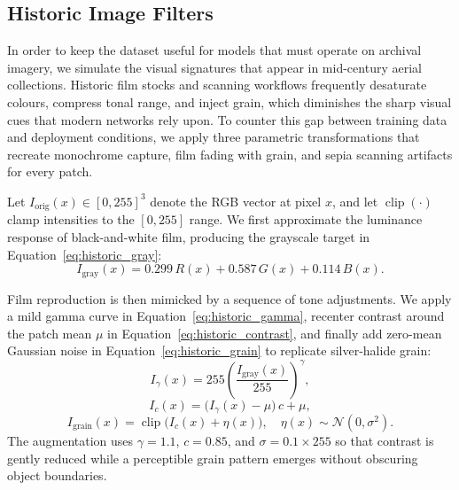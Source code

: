 \subsection{Historic Image Filters}

In order to keep the dataset useful for models that must operate on archival imagery, we simulate the visual signatures that appear in mid-century aerial collections. Historic film stocks and scanning workflows frequently desaturate colours, compress tonal range, and inject grain, which diminishes the sharp visual cues that modern networks rely upon. To counter this gap between training data and deployment conditions, we apply three parametric transformations that recreate monochrome capture, film fading with grain, and sepia scanning artifacts for every patch.

Let $I_{\text{orig}}(x) \in [0,255]^3$ denote the RGB vector at pixel $x$, and let $\operatorname{clip}(\cdot)$ clamp intensities to the $[0,255]$ range. We first approximate the luminance response of black-and-white film, producing the grayscale target in Equation~\ref{eq:historic_gray}:
\begin{equation}
I_{\text{gray}}(x) = 0.299\,R(x) + 0.587\,G(x) + 0.114\,B(x).
\label{eq:historic_gray}
\end{equation}

Film reproduction is then mimicked by a sequence of tone adjustments. We apply a mild gamma curve in Equation~\ref{eq:historic_gamma}, recenter contrast around the patch mean $\mu$ in Equation~\ref{eq:historic_contrast}, and finally add zero-mean Gaussian noise in Equation~\ref{eq:historic_grain} to replicate silver-halide grain:
\begin{equation}
I_{\gamma}(x) = 255\left( \frac{I_{\text{gray}}(x)}{255} \right)^{\gamma},
\label{eq:historic_gamma}
\end{equation}
\begin{equation}
I_{c}(x) = \big(I_{\gamma}(x) - \mu\big)\,c + \mu,
\label{eq:historic_contrast}
\end{equation}
\begin{equation}
I_{\text{grain}}(x) = \operatorname{clip}\big(I_{c}(x) + \eta(x)\big), \quad \eta(x) \sim \mathcal{N}(0, \sigma^2).
\label{eq:historic_grain}
\end{equation}
The augmentation uses $\gamma = 1.1$, $c = 0.85$, and $\sigma = 0.1\times 255$ so that contrast is gently reduced while a perceptible grain pattern emerges without obscuring object boundaries.

